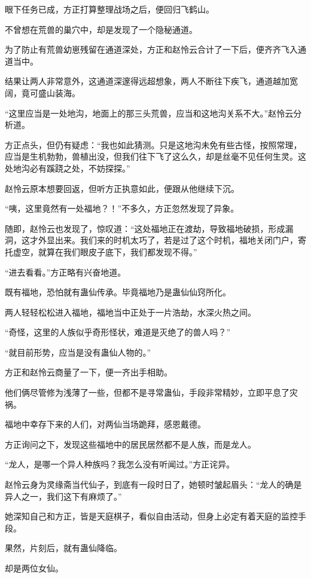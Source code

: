 \begin{this_body}
眼下任务已成，方正打算整理战场之后，便回归飞鹤山。

不曾想在荒兽的巢穴中，却是发现了一个隐秘通道。

为了防止有荒兽幼崽残留在通道深处，方正和赵怜云合计了一下后，便齐齐飞入通道当中。

结果让两人非常意外，这通道深邃得远超想象，两人不断往下疾飞，通道越加宽阔，竟可盛山装海。

“这里应当是一处地沟，地面上的那三头荒兽，应当和这地沟关系不大。”赵怜云分析道。

方正点头，但仍有疑虑：“我也如此猜测。只是这地沟未免有些古怪，按照常理，应当是生机勃勃，兽植出没，但我们往下飞了这么久，却是丝毫不见任何生灵。这处地沟必有蹊跷之处，不妨探探。”

赵怜云原本想要回返，但听方正执意如此，便跟从他继续下沉。

“咦，这里竟然有一处福地？！”不多久，方正忽然发现了异象。

随即，赵怜云也发现了，惊叹道：“这处福地正在渡劫，导致福地破损，形成漏洞，这才外显出来。我们来的时机太巧了，若是过了这个时机，福地关闭门户，寄托虚空，就算在我们眼皮子底下，我们都发现不得。”

“进去看看。”方正略有兴奋地道。

既有福地，恐怕就有蛊仙传承。毕竟福地乃是蛊仙仙窍所化。

两人轻轻松松进入福地，福地当中正处于一片浩劫，水深火热之间。

“奇怪，这里的人族似乎奇形怪状，难道是灭绝了的兽人吗？”

“就目前形势，应当是没有蛊仙人物的。”

方正和赵怜云商量了一下，便一齐出手相助。

他们俩尽管修为浅薄了一些，但都不是寻常蛊仙，手段非常精妙，立即平息了灾祸。

福地中幸存下来的人们，对两仙当场跪拜，感恩戴德。

方正询问之下，发现这些福地中的居民居然都不是人族，而是龙人。

“龙人，是哪一个异人种族吗？我怎么没有听闻过。”方正诧异。

赵怜云身为灵缘斋当代仙子，到底有一段时日了，她顿时皱起眉头：“龙人的确是异人之一，我们这下有麻烦了。”

她深知自己和方正，皆是天庭棋子，看似自由活动，但身上必定有着天庭的监控手段。

果然，片刻后，就有蛊仙降临。

却是两位女仙。


\end{this_body}
